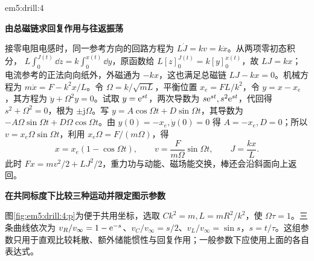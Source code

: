 \begin{drillsolution}{em5:drill:4}
\par\medskip{}\noindent\textbf{由总磁链求回复作用与往返振荡}\par\nobreak
接零电阻电感时，同一参考方向的回路方程为 $L\dot J=kv=k\dot x$。从两项零初态积分，
$L\int_0^{J(t)}\dd z=k\int_0^{x(t)}\dd y$，原函数给 $L[z]_0^{J(t)}=k[y]_0^{x(t)}$，故 $LJ=kx$；电流参考的正法向向纸外，外磁通为 $-kx$，这也满足总磁链 $LJ-kx=0$。机械方程为 $m\ddot x=F-k^2x/L$。令 $\Omega=k/\sqrt{mL}$，平衡位置 $x_e=FL/k^2$，令 $y=x-x_e$，其方程为 $\ddot y+\Omega^2y=0$。试取 $y=\mathrm e^{st}$，两次导数为 $s\mathrm e^{st},s^2\mathrm e^{st}$，代回得 $s^2+\Omega^2=0$，根为 $\pm\mathrm j\Omega$。写 $y=A\cos\Omega t+D\sin\Omega t$，其导数为 $-A\Omega\sin\Omega t+D\Omega\cos\Omega t$。由 $y(0)=-x_e,\dot y(0)=0$ 得 $A=-x_e,D=0$；所以 $v=x_e\Omega\sin\Omega t$，利用 $x_e\Omega=F/(m\Omega)$，得
\[x=x_e(1-\cos\Omega t),\qquad
v=\frac{F}{m\Omega}\sin\Omega t,\qquad J=\frac{kx}{L}.\]
此时 $Fx=mv^2/2+LJ^2/2$，重力功与动能、磁场能交换，棒还会沿斜面向上返回。



\par\medskip{}\noindent\textbf{在共同标度下比较三种运动并限定图示参数}\par\nobreak
图\ref{fig:em5:drill:4:p}为便于共用坐标，选取 $Ck^2=m,L=mR^2/k^2$，使 $\Omega\tau=1$。三条曲线依次为 $v_R/v_\infty=1-\mathrm e^{-s}$、$v_C/v_\infty=s/2$、$v_L/v_\infty=\sin s$，$s=t/\tau$。这组参数只用于直观比较耗散、额外储能惯性与回复作用；一般参数下应使用上面的各自表达式。
\end{drillsolution}
